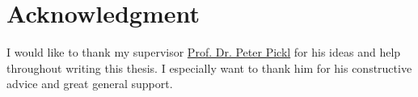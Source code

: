 \cleardoublepage
{} \label{acknowledgment}

\chapter*{Acknowledgment}

I would like to thank my supervisor \href{http://www.mathematik.uni-muenchen.de/personen/professoren/pickl/index.html}{Prof. Dr. Peter Pickl} for his ideas and help throughout writing this thesis. I especially want to thank him for his constructive advice and great general support.
